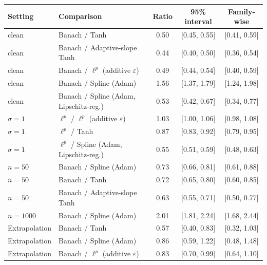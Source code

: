\begin{tabular}{llccc}
\toprule
Setting & Comparison & Ratio & 95\% interval & Family-wise \\
\midrule
clean & Banach / Tanh & 0.50 & [0.45, 0.55] & [0.41, 0.59] \\
clean & Banach / Adaptive-slope Tanh & 0.44 & [0.40, 0.50] & [0.36, 0.54] \\
clean & Banach / $\ell^p$ (additive $\varepsilon$) & 0.49 & [0.44, 0.54] & [0.40, 0.59] \\
clean & Banach / Spline (Adam) & 1.56 & [1.37, 1.79] & [1.24, 1.98] \\
clean & Banach / Spline (Adam, Lipschitz-reg.) & 0.53 & [0.42, 0.67] & [0.34, 0.77] \\
$\sigma=1$ & $\ell^p$ / $\ell^p$ (additive $\varepsilon$) & 1.03 & [1.00, 1.06] & [0.98, 1.08] \\
$\sigma=1$ & $\ell^p$ / Tanh & 0.87 & [0.83, 0.92] & [0.79, 0.95] \\
$\sigma=1$ & $\ell^p$ / Spline (Adam, Lipschitz-reg.) & 0.55 & [0.51, 0.59] & [0.48, 0.63] \\
$n=50$ & Banach / Spline (Adam) & 0.73 & [0.66, 0.81] & [0.61, 0.88] \\
$n=50$ & Banach / Tanh & 0.72 & [0.65, 0.80] & [0.60, 0.85] \\
$n=50$ & Banach / Adaptive-slope Tanh & 0.63 & [0.55, 0.71] & [0.50, 0.77] \\
$n=1000$ & Banach / Spline (Adam) & 2.01 & [1.81, 2.24] & [1.68, 2.44] \\
Extrapolation & Banach / Tanh & 0.57 & [0.40, 0.83] & [0.32, 1.03] \\
Extrapolation & Banach / Spline (Adam) & 0.86 & [0.59, 1.22] & [0.48, 1.48] \\
Extrapolation & Banach / $\ell^p$ (additive $\varepsilon$) & 0.83 & [0.70, 0.99] & [0.64, 1.10] \\
\bottomrule\end{tabular}
